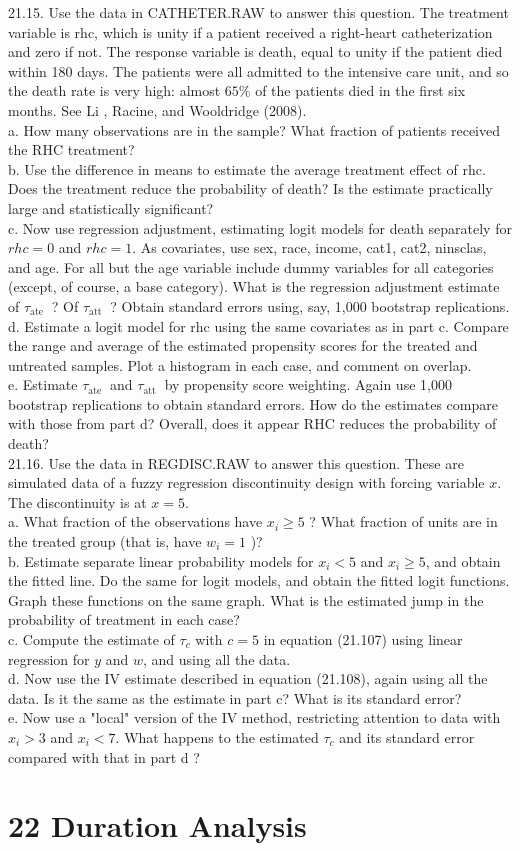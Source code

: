 \documentclass[10pt]{article}
\begin{document}
21.15. Use the data in CATHETER.RAW to answer this question. The treatment variable is rhc, which is unity if a patient received a right-heart catheterization and zero if not. The response variable is death, equal to unity if the patient died within 180 days. The patients were all admitted to the intensive care unit, and so the death rate is very high: almost $65 \%$ of the patients died in the first six months. See Li , Racine, and Wooldridge (2008).\\
a. How many observations are in the sample? What fraction of patients received the RHC treatment?\\
b. Use the difference in means to estimate the average treatment effect of rhc. Does the treatment reduce the probability of death? Is the estimate practically large and statistically significant?\\
c. Now use regression adjustment, estimating logit models for death separately for $r h c=0$ and $r h c=1$. As covariates, use sex, race, income, cat1, cat2, ninsclas, and age. For all but the age variable include dummy variables for all categories (except, of course, a base category). What is the regression adjustment estimate of $\tau_{\text {ate }}$ ? Of $\tau_{\text {att }}$ ? Obtain standard errors using, say, 1,000 bootstrap replications.\\
d. Estimate a logit model for rhc using the same covariates as in part c. Compare the range and average of the estimated propensity scores for the treated and untreated samples. Plot a histogram in each case, and comment on overlap.\\
e. Estimate $\tau_{\text {ate }}$ and $\tau_{\text {att }}$ by propensity score weighting. Again use 1,000 bootstrap replications to obtain standard errors. How do the estimates compare with those from part d? Overall, does it appear RHC reduces the probability of death?\\
21.16. Use the data in REGDISC.RAW to answer this question. These are simulated data of a fuzzy regression discontinuity design with forcing variable $x$. The discontinuity is at $x=5$.\\
a. What fraction of the observations have $x_{i} \geq 5$ ? What fraction of units are in the treated group (that is, have $w_{i}=1$ )?\\
b. Estimate separate linear probability models for $x_{i}<5$ and $x_{i} \geq 5$, and obtain the fitted line. Do the same for logit models, and obtain the fitted logit functions. Graph these functions on the same graph. What is the estimated jump in the probability of treatment in each case?\\
c. Compute the estimate of $\tau_{c}$ with $c=5$ in equation (21.107) using linear regression for $y$ and $w$, and using all the data.\\
d. Now use the IV estimate described in equation (21.108), again using all the data. Is it the same as the estimate in part c? What is its standard error?\\
e. Now use a "local" version of the IV method, restricting attention to data with $x_{i}>3$ and $x_{i}<7$. What happens to the estimated $\tau_{c}$ and its standard error compared with that in part d ?

\section*{22 Duration Analysis}
\end{document}

